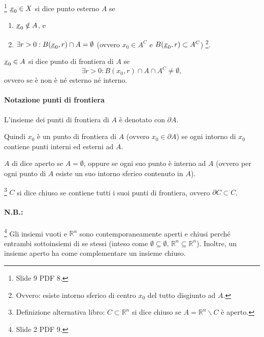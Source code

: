 \begin{definition}\footnote{Slide 9 PDF 8.}
    $\uline x_0\in X$ si dice punto esterno $A$ se
    \begin{enumerate}
        \item $\uline x_0\notin A$, e
        \item $\exists r>0: B(\uline x_0, r)\cap A= \emptyset$ (ovvero $x_0\in A^C$ e $B(\uline x_0, r)\subset A^C$) \footnote{Ovvero: esiste intorno sferico di centro $x_0$ del tutto disgiunto ad $A$.}.
    \end{enumerate}
\end{definition}

\begin{definition}
    $\uline x_0\in A$ si dice punto di frontiera di $A$ se
    \begin{equation*}
        \exists r>0 \colon B(x_0,r)\cap A \cap A^C \neq \emptyset,
    \end{equation*}
    ovvero se è non è né esterno né interno.
\end{definition}

\paragraph{Notazione punti di frontiera} L'insieme dei punti di frontiera di $A$ è denotato con $\partial A$.

Quindi $x_0$ è un punto di frontiera di $A$ (ovvero $x_0\in\partial A$) se ogni intorno di $x_0$ contiene punti interni ed esterni ad $A$.

\begin{definition}\label{def:insieme_aperto}
    $A$ di dice aperto se $A=\emptyset$, oppure se ogni suo punto è interno ad $A$ (ovvero per ogni punto di $A$ esiste un suo intorno sferico contenuto in $A$).
\end{definition}

\begin{definition}\footnote{Definizione alternativa libro: $C\subset\mathbb R^n$ si dice chiuso se $A=\mathbb R^n\backslash C$ è aperto.}
    $C$ si dice chiuso se contiene tutti i suoi punti di frontiera, ovvero $\partial C\subset C$.
\end{definition}

\paragraph{N.B.:}\footnote{Slide 2 PDF 9.} Gli insiemi vuoti e $\mathbb R^n$ sono contemporaneamente aperti e chiusi perché entrambi sottoinsiemi di se stessi (inteso come $\emptyset\subseteq\emptyset,\, \mathbb R^n\subseteq\mathbb R^n$). Inoltre, un insieme aperto ha come complementare un insieme chiuso.

